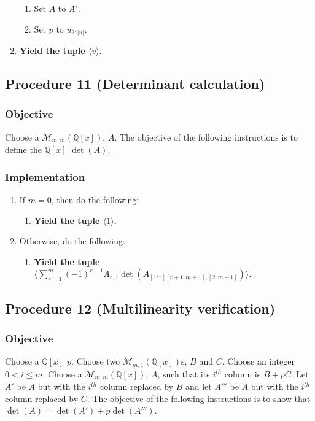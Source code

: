 \documentclass[twocolumn]{article}
\begin{document}
\begin{enumerate}
\begin{enumerate}
						\item Set $A$ to $A'$.
						\item Set $p$ to $u_{2:\lvert u\rvert}$.
					\end{enumerate}
					\item \textbf{Yield the tuple $\langle v\rangle$.}
				\end{enumerate}
		\subsection{Procedure 11 (Determinant calculation)}\label{sec:procedure 11}
			\subsubsection{Objective}
				Choose a $\mathcal{M}_{m,m}(\mathbb{Q}[x])$, $A$. The objective of the following instructions is to define the $\mathbb{Q}[x]$ $\det(A)$.
			\subsubsection{Implementation}
				\begin{enumerate}
					\item If $m=0$, then do the following:
					\begin{enumerate}
						\item \textbf{Yield the tuple $\langle 1\rangle$.}
					\end{enumerate}
					\item Otherwise, do the following:
					\begin{enumerate}
						\item \textbf{Yield the tuple $\langle\sum_{r=1}^m (-1)^{r-1}A_{r,1}\det(A_{[1:r][r+1,m+1],[2:m+1]})\rangle$.}
					\end{enumerate}
				\end{enumerate}
		\subsection{Procedure 12 (Multilinearity verification)}\label{sec:procedure 12}
			\subsubsection{Objective}
				Choose a $\mathbb{Q}[x]$ $p$. Choose two $\mathcal{M}_{m,1}(\mathbb{Q}[x])$s, $B$ and $C$. Choose an integer $0<i\le m$. Choose a $\mathcal{M}_{m,m}(\mathbb{Q}[x])$, $A$, such that its $i^{th}$ column is $B+pC$. Let $A'$ be $A$ but with the $i^{th}$ column replaced by $B$ and let $A'''$ be $A$ but with the $i^{th}$ column replaced by $C$. The objective of the following instructions is to show that $\det(A)=\det(A') + p\det(A''')$.
\end{document}
